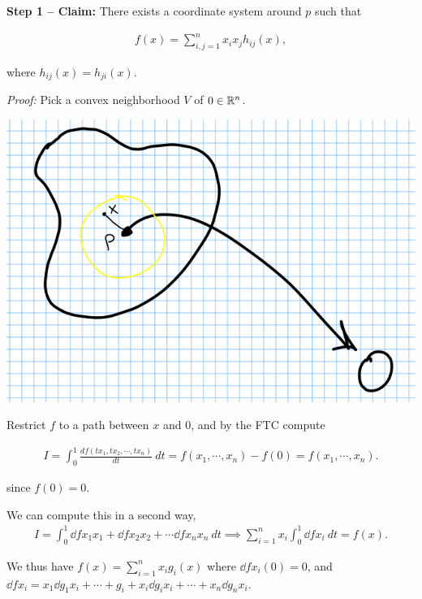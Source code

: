 \textbf{Step 1 -- Claim:} There exists a coordinate system around \(p\)
such that

\begin{align*}
f(x) = \sum_{i,j=1}^n x_i x_j h_{ij}(x)
,\end{align*}

where \(h_{ij}(x) = h_{ji}(x)\).

\emph{Proof:} Pick a convex neighborhood \(V\) of \(0\in \mathbb{R}^n\).

\begin{center}
    \includegraphics[width=\textwidth,keepaspectratio]{sections/figures/2020-01-09-11:38.png}\\
\end{center}


Restrict \(f\) to a path between \(x\) and \(0\), and by the FTC compute

\begin{align*}
I = \int_0^1 \frac{df(tx_1, tx_2, \cdots, tx_n) }{dt}  ~dt = f(x_1, \cdots, x_n) - f(0) = f(x_1, \cdots, x_n)
.\end{align*}

since \(f(0) = 0\).

We can compute this in a second way, \begin{align*}
I = \int_0^1 \dd{f}{x_1} x_1 + \dd{f}{x_2} x_2 + \cdots \dd{f}{x_n} x_n ~dt 
\implies \sum_{i=1}^n x_i \int_0^1  \dd{f}{x_i} ~dt = f(x)
.\end{align*}

We thus have \(f(x) = \sum_{i=1}^n x_i g_i(x)\) where
\(\dd{f}{x_i}(0) = 0\), and
\(\dd{f}{x_i} = x_1 \dd{g_1}{x_i} + \cdots + g_i + x_i \dd{g_i}{x_i} + \cdots + x_n \dd{g_n}{x_i}\).

